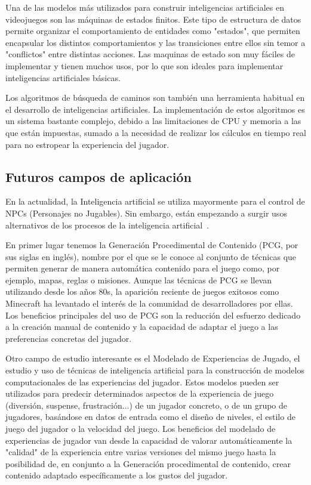 Una de las modelos más utilizados para construir inteligencias artificiales en videojuegos son las máquinas de estados finitos. Este tipo de estructura de datos permite organizar el comportamiento de entidades como "estados", que permiten encapsular los distintos comportamientos y las transiciones entre ellos sin temor a "conflictos" entre distintas acciones. Las maquinas de estado son muy fáciles de implementar y tienen muchos usos, por lo que son ideales para implementar inteligencias artificiales básicas.

Los algoritmos de búsqueda de caminos son también una herramienta habitual en el desarrollo de inteligencias artificiales. La implementación de estos algoritmos es un sistema bastante complejo, debido a las limitaciones de CPU y memoria a las que están impuestas, sumado a la necesidad de realizar los cálculos en tiempo real para no estropear la experiencia del jugador. 

\subsection{Futuros campos de aplicación}
En la actualidad, la Inteligencia artificial se utiliza mayormente para el control de NPCs (Personajes no Jugables). Sin embargo, están empezando a surgir usos alternativos de los procesos de la inteligencia artificial~\cite{libro_blanco}.

En primer lugar tenemos la Generación Procedimental de Contenido (PCG, por sus siglas en inglés), nombre por el que se le conoce al conjunto de técnicas que permiten generar de manera automática contenido para el juego como, por ejemplo, mapas, reglas o misiones. Aunque las técnicas de PCG se llevan utilizando desde los años 80s, la aparición reciente de juegos exitosos como Minecraft ha levantado el interés de la comunidad de desarrolladores por ellas. Los beneficios principales del uso de PCG son la reducción del esfuerzo dedicado a la creación manual de contenido y la capacidad de adaptar el juego a las preferencias concretas del jugador.

Otro campo de estudio interesante es el Modelado de Experiencias de Jugado, el estudio y uso de técnicas de inteligencia artificial para la construcción de modelos computacionales de las experiencias del jugador. Estos modelos pueden ser utilizados para predecir determinados aspectos de la experiencia de juego (diversión, suspense, frustración...) de un jugador concreto, o de un grupo de jugadores, basándose en datos de entrada como el diseño de niveles, el estilo de juego del jugador o la velocidad del juego. Los beneficios del modelado de experiencias de jugador van desde la capacidad de valorar automáticamente la "calidad" de la experiencia entre varias versiones del mismo juego hasta la posibilidad de, en conjunto a la Generación procedimental de contenido, crear contenido adaptado específicamente a los gustos del jugador.